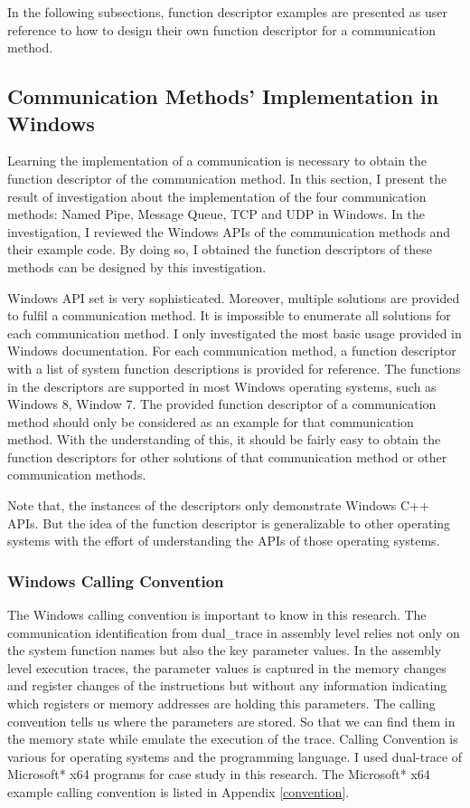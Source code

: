 In the following subsections, function descriptor examples are presented as user reference to how to design their own function descriptor for a communication method.

\subsection{Communication Methods' Implementation in Windows}\label{windows}
Learning the implementation of a communication is necessary to obtain the function descriptor of the communication method.  In this section, I present the result of investigation about the implementation of the four communication methods: Named Pipe, Message Queue, TCP and UDP in Windows. In the investigation, I reviewed the Windows APIs of the communication methods and their example code. By doing so, I obtained the function descriptors of these methods can be designed by this investigation.

Windows API set is very sophisticated. Moreover, multiple solutions are provided to fulfil a communication method. It is impossible to enumerate all solutions for each communication method. I only investigated the most basic usage provided in Windows documentation. For each communication method, a function descriptor with a list of system function descriptions is provided for reference. The functions in the descriptors are supported in most Windows operating systems, such as Windows 8, Window 7. The provided function descriptor of a communication method should only be considered as an example for that communication method. With the understanding of this, it should be fairly easy to obtain the function descriptors for other solutions of that communication method or other communication methods. 

Note that, the instances of the descriptors only demonstrate Windows C++ APIs. But the idea of the function descriptor is generalizable to other operating systems with the effort of understanding the APIs of those operating systems.

\subsubsection{Windows Calling Convention}
The Windows calling convention is important to know in this research. The communication identification from dual\_trace in assembly level relies not only on the system function names but also the key parameter values. In the assembly level execution traces, the parameter values is captured in the memory changes and register changes of the instructions but without any information indicating which registers or memory addresses are holding this parameters. The calling convention tells us where the parameters are stored. So that we can find them in the memory state while emulate the execution of the trace. Calling Convention is various for operating systems and the programming language. I used dual-trace of Microsoft* x64 programs for case study in this research. The Microsoft* x64 example calling convention is listed in Appendix \ref{convention}.

